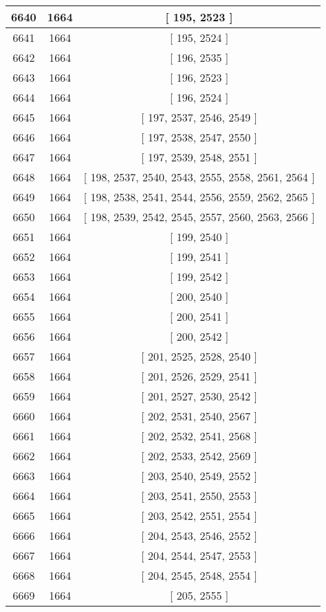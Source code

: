 \begin{center}
\begin{longtable}[H]{|| c c c ||}
\hline
6640 & 1664 & [ 195, 2523 ] \\ 
\hline
6641 & 1664 & [ 195, 2524 ] \\ 
\hline
6642 & 1664 & [ 196, 2535 ] \\ 
\hline
6643 & 1664 & [ 196, 2523 ] \\ 
\hline
6644 & 1664 & [ 196, 2524 ] \\ 
\hline
6645 & 1664 & [ 197, 2537, 2546, 2549 ] \\ 
\hline
6646 & 1664 & [ 197, 2538, 2547, 2550 ] \\ 
\hline
6647 & 1664 & [ 197, 2539, 2548, 2551 ] \\ 
\hline
6648 & 1664 & [ 198, 2537, 2540, 2543, 2555, 2558, 2561, 2564 ] \\ 
\hline
6649 & 1664 & [ 198, 2538, 2541, 2544, 2556, 2559, 2562, 2565 ] \\ 
\hline
6650 & 1664 & [ 198, 2539, 2542, 2545, 2557, 2560, 2563, 2566 ] \\ 
\hline
6651 & 1664 & [ 199, 2540 ] \\ 
\hline
6652 & 1664 & [ 199, 2541 ] \\ 
\hline
6653 & 1664 & [ 199, 2542 ] \\ 
\hline
6654 & 1664 & [ 200, 2540 ] \\ 
\hline
6655 & 1664 & [ 200, 2541 ] \\ 
\hline
6656 & 1664 & [ 200, 2542 ] \\ 
\hline
6657 & 1664 & [ 201, 2525, 2528, 2540 ] \\ 
\hline
6658 & 1664 & [ 201, 2526, 2529, 2541 ] \\ 
\hline
6659 & 1664 & [ 201, 2527, 2530, 2542 ] \\ 
\hline
6660 & 1664 & [ 202, 2531, 2540, 2567 ] \\ 
\hline
6661 & 1664 & [ 202, 2532, 2541, 2568 ] \\ 
\hline
6662 & 1664 & [ 202, 2533, 2542, 2569 ] \\ 
\hline
6663 & 1664 & [ 203, 2540, 2549, 2552 ] \\ 
\hline
6664 & 1664 & [ 203, 2541, 2550, 2553 ] \\ 
\hline
6665 & 1664 & [ 203, 2542, 2551, 2554 ] \\ 
\hline
6666 & 1664 & [ 204, 2543, 2546, 2552 ] \\ 
\hline
6667 & 1664 & [ 204, 2544, 2547, 2553 ] \\ 
\hline
6668 & 1664 & [ 204, 2545, 2548, 2554 ] \\ 
\hline
6669 & 1664 & [ 205, 2555 ] \\ 

\end{longtable}
\end{center}
